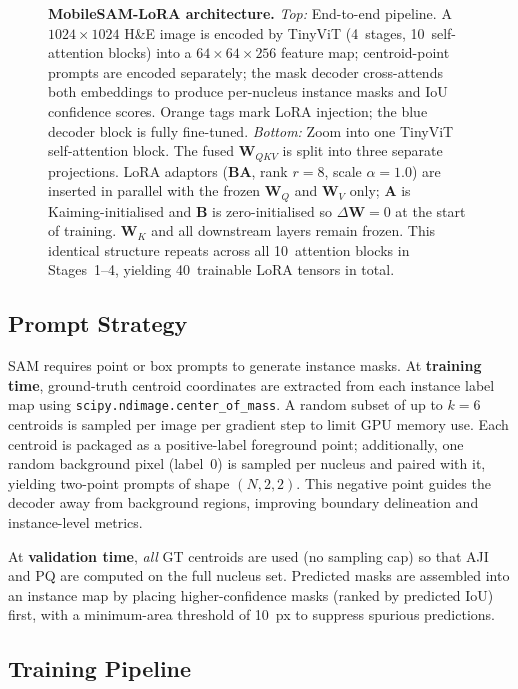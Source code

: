 \documentclass[10pt,twocolumn]{article}
\begin{document}
\begin{figure}[t]
\begin{tikzpicture}
\end{tikzpicture}
\caption{\textbf{MobileSAM-LoRA architecture.}
\emph{Top:} End-to-end pipeline. A $1024{\times}1024$ H\&E image
is encoded by TinyViT (4~stages, 10~self-attention blocks) into a
$64{\times}64{\times}256$ feature map; centroid-point prompts are
encoded separately; the mask decoder cross-attends both embeddings
to produce per-nucleus instance masks and IoU confidence scores.
Orange tags mark LoRA injection; the blue decoder block is fully
fine-tuned.
\emph{Bottom:} Zoom into one TinyViT self-attention block.
The fused $\mathbf{W}_{QKV}$ is split into three separate
projections. LoRA adaptors ($\mathbf{B}\mathbf{A}$, rank $r{=}8$,
scale $\alpha{=}1.0$) are inserted in parallel with the frozen
$\mathbf{W}_Q$ and $\mathbf{W}_V$ only; $\mathbf{A}$ is
Kaiming-initialised and $\mathbf{B}$ is zero-initialised so
$\Delta\mathbf{W}{=}0$ at the start of training.
$\mathbf{W}_K$ and all downstream layers remain frozen.
This identical structure repeats across all 10~attention blocks
in Stages~1--4, yielding 40~trainable LoRA tensors in total.}
\label{fig:arch}
\end{figure}

\subsection{Prompt Strategy}

SAM requires point or box prompts to generate instance masks.
At \textbf{training time}, ground-truth centroid coordinates
are extracted from each instance label map using
\texttt{scipy.ndimage.center\_of\_mass}. A random subset of
up to $k=6$ centroids is sampled per image per gradient step
to limit GPU memory use. Each centroid is packaged as a
positive-label foreground point; additionally, one random
background pixel (label~0) is sampled per nucleus and paired
with it, yielding two-point prompts of shape $(N,2,2)$. This
negative point guides the decoder away from background regions,
improving boundary delineation and instance-level metrics.

At \textbf{validation time}, \emph{all} GT centroids are used
(no sampling cap) so that AJI and PQ are computed on the full
nucleus set. Predicted masks are assembled into an instance map
by placing higher-confidence masks (ranked by predicted IoU)
first, with a minimum-area threshold of 10~px to suppress
spurious predictions.

\subsection{Training Pipeline}
\end{document}
